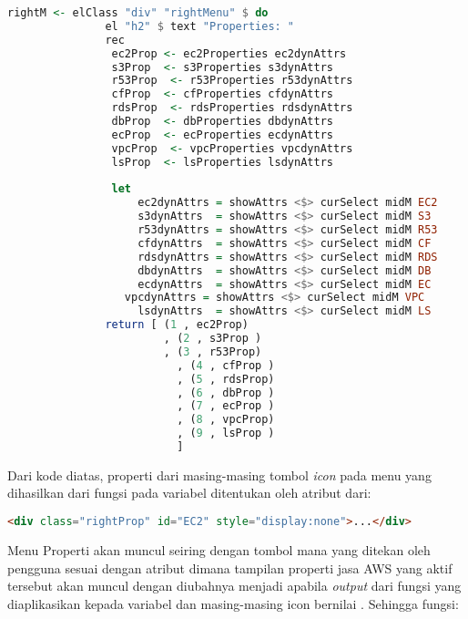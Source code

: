 \documentclass[pi.tex]{subfile}
\begin{document}
   \begin{lstlisting}[language=Haskell]
    rightM <- elClass "div" "rightMenu" $ do
               el "h2" $ text "Properties: "
               rec
                ec2Prop <- ec2Properties ec2dynAttrs
                s3Prop  <- s3Properties s3dynAttrs
                r53Prop  <- r53Properties r53dynAttrs
                cfProp  <- cfProperties cfdynAttrs
                rdsProp  <- rdsProperties rdsdynAttrs
                dbProp  <- dbProperties dbdynAttrs
                ecProp  <- ecProperties ecdynAttrs
                vpcProp  <- vpcProperties vpcdynAttrs
                lsProp  <- lsProperties lsdynAttrs
      
                let 
	                ec2dynAttrs = showAttrs <$> curSelect midM EC2
	                s3dynAttrs  = showAttrs <$> curSelect midM S3
	                r53dynAttrs = showAttrs <$> curSelect midM R53
	                cfdynAttrs  = showAttrs <$> curSelect midM CF
	                rdsdynAttrs = showAttrs <$> curSelect midM RDS
	                dbdynAttrs  = showAttrs <$> curSelect midM DB
	                ecdynAttrs  = showAttrs <$> curSelect midM EC
                  vpcdynAttrs = showAttrs <$> curSelect midM VPC
	                lsdynAttrs  = showAttrs <$> curSelect midM LS
               return [ (1 , ec2Prop)
	                    , (2 , s3Prop )
	                    , (3 , r53Prop)
		                  , (4 , cfProp )
		                  , (5 , rdsProp)
		                  , (6 , dbProp )
		                  , (7 , ecProp )
		                  , (8 , vpcProp)
		                  , (9 , lsProp )
		                  ]
   \end{lstlisting}

   \hspace{10pt}Dari kode diatas, properti dari masing-masing tombol \emph{icon} pada menu yang dihasilkan dari fungsi  pada variabel  ditentukan oleh atribut dari:\\

  \begin{lstlisting}[language=HTML]
  <div class="rightProp" id="EC2" style="display:none">...</div>
  \end{lstlisting}
  Menu Properti akan muncul seiring dengan tombol mana yang ditekan oleh pengguna sesuai dengan atribut  dimana tampilan properti jasa AWS yang aktif tersebut akan muncul dengan diubahnya  menjadi  apabila \emph{output} dari fungsi  yang diaplikasikan kepada variabel  dan masing-masing icon bernilai . Sehingga fungsi:\\
\end{document}
